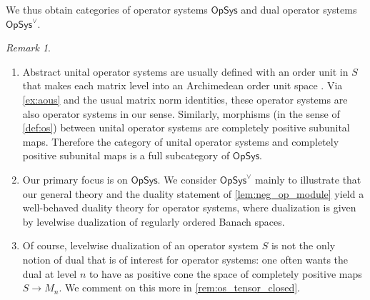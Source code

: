 \documentclass[11pt,onecolumn]{article}
\newcommand{\OpSys}{\mathsf{OpSys}}
\theoremstyle{plain}
\theoremstyle{remark}
\newtheorem{remark}[remark]{Remark}
\theoremstyle{definition}
\begin{document}
We thus obtain categories of operator systems $\OpSys$ and dual operator systems $\OpSys^\vee$.

\begin{remark}
	\label{rem:os_comments_2}
	\begin{enumerate}
		\item
			Abstract unital operator systems are usually defined with an order unit in $S$ that makes each matrix level into an Archimedean order unit space \cite{Paulsen}.
			Via \cref{ex:aous} and the usual matrix norm identities, these operator systems are also operator systems in our sense.
			Similarly, morphisms (in the sense of \cref{def:os}) between unital operator systems are completely positive subunital maps.
			Therefore the category of unital operator systems and completely positive subunital maps is a full subcategory of $\OpSys$.
		\item
			Our primary focus is on $\OpSys$.
			We consider $\OpSys^\vee$ mainly to illustrate that our general theory and the duality statement of \cref{lem:neg_op_module}
			yield a well-behaved duality theory for operator systems, where dualization is given by levelwise dualization of regularly ordered Banach spaces.
		\item\label{rem:os_wrong_dual}
			Of course, levelwise dualization of an operator system $S$ is not the only notion of dual that is of interest for operator systems:
			one often wants the dual at level $n$ to have as positive cone the space of completely positive maps $S \to M_n$.
			We comment on this more in \cref{rem:os_tensor_closed}.
	\end{enumerate}
\end{remark}
\end{document}
